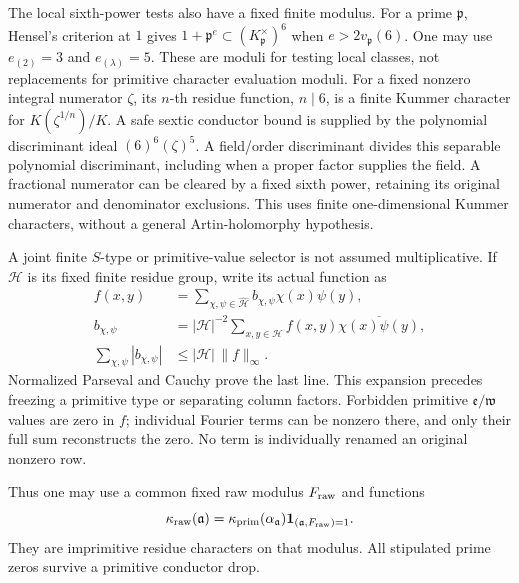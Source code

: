 The local sixth-power tests also have a fixed finite modulus.
For a prime \(\mathfrak p\), Hensel's criterion at \(1\) gives
\(1+\mathfrak p^e\subset(K_{\mathfrak p}^\times)^6\)
when \(e>2v_{\mathfrak p}(6)\).
One may use \(e_{(2)}=3\) and \(e_{(\lambda)}=5\).
These are moduli for testing local classes, not replacements for
primitive character evaluation moduli.
For a fixed nonzero integral numerator \(\zeta\), its
\(n\)-th residue function, \(n\mid6\), is a finite Kummer character
for \(K(\zeta^{1/n})/K\).
A safe sextic conductor bound is supplied by the polynomial
discriminant ideal \((6)^6(\zeta)^5\).
A field/order discriminant divides this separable polynomial
discriminant, including when a proper factor supplies the field.
A fractional numerator can be cleared by a fixed sixth power,
retaining its original numerator and denominator exclusions.
This uses finite one-dimensional Kummer characters, without a
general Artin-holomorphy hypothesis.

A joint finite \(S\)-type or primitive-value selector is not assumed
multiplicative. If \(\mathcal H\) is its fixed finite residue group,
write its actual function as
\begin{equation}\label{rg:joint-selector}
 \begin{aligned}
 f(x,y)&=\sum_{\chi,\psi\in\widehat{\mathcal H}}
                           b_{\chi,\psi}\chi(x)\psi(y),\\
 b_{\chi,\psi}
   &=|\mathcal H|^{-2}\sum_{x,y\in\mathcal H}
                   f(x,y)\overline{\chi(x)\psi(y)},\\
 \sum_{\chi,\psi}|b_{\chi,\psi}|
   &\le|\mathcal H|\,\|f\|_\infty .
 \end{aligned}
\end{equation}
Normalized Parseval and Cauchy prove the last line.
This expansion precedes freezing a primitive type or separating
column factors. Forbidden primitive \(\mathfrak e/\mathfrak w\)
values are zero in \(f\); individual Fourier terms can be nonzero
there, and only their full sum reconstructs the zero.
No term is individually renamed an original nonzero row.

Thus one may use a common fixed raw modulus \(F_{\rm raw}\) and
functions
\begin{equation}\label{rg:raw-character}
 \kappa_{\rm raw}(\mathfrak a)
 =\kappa_{\rm prim}(\alpha_{\mathfrak a})
                         \mathbf1_{(\mathfrak a,F_{\rm raw})=1}.
\end{equation}
They are imprimitive residue characters on that modulus.
All stipulated prime zeros survive a primitive conductor drop.

